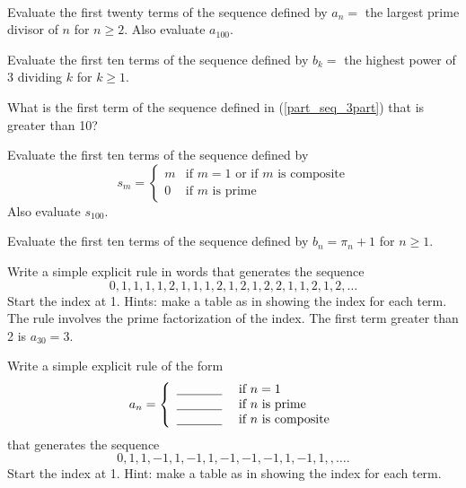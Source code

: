 \begin{act}
\label{act_seq_primes}
~ 
    \begin{actpart}
        \item Evaluate the first twenty terms of the sequence defined by $a_n=$ the largest prime divisor of $n$ for $n \ge 2$.  Also evaluate $a_{100}$.              
            
        \item \label{part_seq_3part} Evaluate the first ten terms of the sequence defined by $b_k=$ the highest power of 3 dividing $k$ for $k \ge 1$. 
            
        \item What is the first term of the sequence defined in (\ref{part_seq_3part}) that is greater than 10?          
            
        \item Evaluate the first ten terms of the sequence defined by 
            $$s_m= \left\{ \begin{array} {cc}
            m & \text{if } m=1 \text{ or if } m \text{ is composite}\\
            0 & \text{if } m \text{ is prime}
            \end{array} \right.$$ 
        Also evaluate $s_{100}$.
            
        \item Evaluate the first ten terms of the sequence defined by $b_n= \pi_n+1$ for $n \ge 1$.
            
        \item Write a simple explicit rule in words that generates the sequence
                $$0,1, 1, 1, 1, 2, 1, 1, 1, 2, 1, 2, 1, 2, 2, 1, 1, 2, 1, 2,\ldots$$  %
        Start the index at 1. Hints: make a table as in  showing the index for each term. The rule involves the prime factorization of the index. The first term greater than 2 is $a_{30}=3$.
            
        \item Write a simple explicit rule of the form  
            $$a_n = \left\{ \begin{array} {ll}
            \underline{\hspace{.5in}} & \text{ if } n=1 \\ 
            \underline{\hspace{.5in}} & \text{ if } n \text{ is prime} \\  
            \underline{\hspace{.5in}} & \text{ if } n \text{ is composite} \\ 
            \end{array} \right.$$
        that generates the sequence
            $$ 0, 1, 1, -1, 1, -1, 1, -1, -1, -1, 1, -1, 1,,\ldots.$$ %
        Start the index at 1. Hint: make a table as in  showing the index for each term.
            

\end{actpart}
\end{act}
